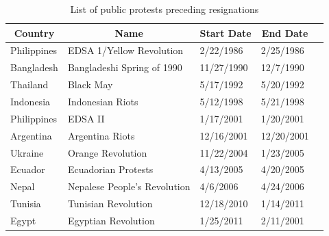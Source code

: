 \documentclass[12pt,final,fleqn]{article}
\theoremstyle{plain}
\begin{document}
\begin{table}[!htb]
\caption{List of public protests preceding resignations} \label{tab:protest-list}
\vspace{-5pt}
\scriptsize
\begin{center}
\begin{threeparttable}
\begin{tabular*}{\textwidth}{l@{\extracolsep{\fill}}llll}
  \hline
    \hline
\multicolumn{1}{c}{Country}&\multicolumn{1}{c}{Name}&\multicolumn{1}{c}{Start Date}&\multicolumn{1}{c}{End Date}\\
  \hline
Philippines & EDSA 1/Yellow Revolution & 2/22/1986 & 2/25/1986\\
Bangladesh & Bangladeshi Spring of 1990 & 11/27/1990 & 12/7/1990\\
Thailand & Black May & 5/17/1992 & 5/20/1992\\
Indonesia & Indonesian Riots & 5/12/1998 & 5/21/1998\\
Philippines & EDSA II & 1/17/2001 & 1/20/2001\\
Argentina & Argentina Riots & 12/16/2001 & 12/20/2001\\
Ukraine & Orange Revolution & 11/22/2004 & 1/23/2005\\
Ecuador & Ecuadorian Protests & 4/13/2005 & 4/20/2005\\
Nepal & Nepalese People's Revolution & 4/6/2006 & 4/24/2006\\
Tunisia & Tunisian Revolution & 12/18/2010 & 1/14/2011\\
Egypt & Egyptian Revolution & 1/25/2011 & 2/11/2001\\
   \hline
   \hline
\end{tabular*}
\scriptsize
\end{threeparttable}
\end{center}
\end{table}
\end{document}
